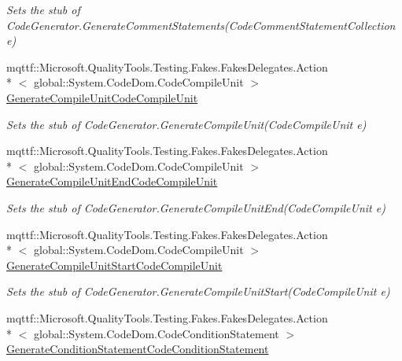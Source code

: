 \begin{DoxyCompactItemize}
\begin{DoxyCompactList}\small\item\em Sets the stub of Code\-Generator.\-Generate\-Comment\-Statements(\-Code\-Comment\-Statement\-Collection e)\end{DoxyCompactList}\item 
mqttf\-::\-Microsoft.\-Quality\-Tools.\-Testing.\-Fakes.\-Fakes\-Delegates.\-Action\\*
$<$ global\-::\-System.\-Code\-Dom.\-Code\-Compile\-Unit $>$ \hyperlink{class_system_1_1_code_dom_1_1_compiler_1_1_fakes_1_1_stub_code_compiler_a169d85e1a16a122e2a4a72c17008fc5c}{Generate\-Compile\-Unit\-Code\-Compile\-Unit}
\begin{DoxyCompactList}\small\item\em Sets the stub of Code\-Generator.\-Generate\-Compile\-Unit(\-Code\-Compile\-Unit e)\end{DoxyCompactList}\item 
mqttf\-::\-Microsoft.\-Quality\-Tools.\-Testing.\-Fakes.\-Fakes\-Delegates.\-Action\\*
$<$ global\-::\-System.\-Code\-Dom.\-Code\-Compile\-Unit $>$ \hyperlink{class_system_1_1_code_dom_1_1_compiler_1_1_fakes_1_1_stub_code_compiler_aeecd28f0f345a245c628b65b74d93e79}{Generate\-Compile\-Unit\-End\-Code\-Compile\-Unit}
\begin{DoxyCompactList}\small\item\em Sets the stub of Code\-Generator.\-Generate\-Compile\-Unit\-End(\-Code\-Compile\-Unit e)\end{DoxyCompactList}\item 
mqttf\-::\-Microsoft.\-Quality\-Tools.\-Testing.\-Fakes.\-Fakes\-Delegates.\-Action\\*
$<$ global\-::\-System.\-Code\-Dom.\-Code\-Compile\-Unit $>$ \hyperlink{class_system_1_1_code_dom_1_1_compiler_1_1_fakes_1_1_stub_code_compiler_a89a969f97178016bf0cfb2be1450e662}{Generate\-Compile\-Unit\-Start\-Code\-Compile\-Unit}
\begin{DoxyCompactList}\small\item\em Sets the stub of Code\-Generator.\-Generate\-Compile\-Unit\-Start(\-Code\-Compile\-Unit e)\end{DoxyCompactList}\item 
mqttf\-::\-Microsoft.\-Quality\-Tools.\-Testing.\-Fakes.\-Fakes\-Delegates.\-Action\\*
$<$ global\-::\-System.\-Code\-Dom.\-Code\-Condition\-Statement $>$ \hyperlink{class_system_1_1_code_dom_1_1_compiler_1_1_fakes_1_1_stub_code_compiler_aebd0a27e659191e4d15304457fd9eb97}{Generate\-Condition\-Statement\-Code\-Condition\-Statement}

\end{DoxyCompactItemize}
